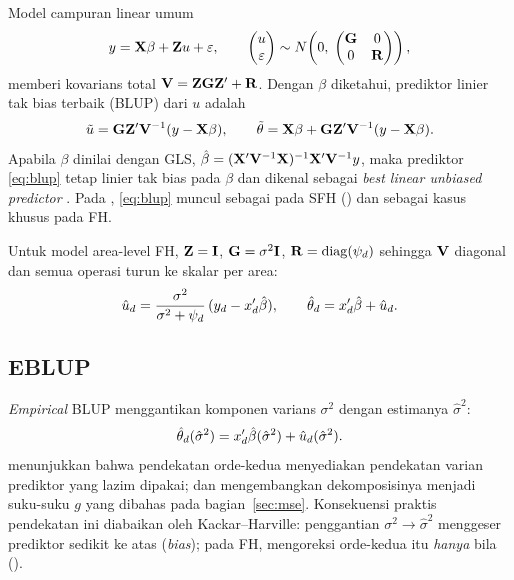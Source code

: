 Model campuran linear umum
\begin{equation}
  y=\mathbf{X}\beta+\mathbf{Z} u+\varepsilon,\qquad
  \begin{pmatrix}u\\\varepsilon\end{pmatrix}
  \sim N\!\left(0,\;
  \begin{pmatrix}\mathbf G&0\\0&\mathbf{R}\end{pmatrix}\right),
  \label{eq:lmm}
\end{equation}
memberi kovarians total $\mathbf{V}=\mathbf{Z}\mathbf G\mathbf{Z}'+\mathbf{R}$. Dengan $\beta$
diketahui, prediktor linier tak bias terbaik (BLUP) dari $u$ adalah
\begin{equation}
  \tilde u=\mathbf G\mathbf{Z}'\mathbf{V}^{-1}(y-\mathbf{X}\beta),
  \qquad
  \tilde\theta=\mathbf{X}\beta+\mathbf G\mathbf{Z}'\mathbf{V}^{-1}(y-\mathbf{X}\beta).
  \label{eq:blup}
\end{equation}
Apabila $\beta$ dinilai dengan GLS, $\hat\beta=(\mathbf{X}'\mathbf{V}^{-1}\mathbf{X})^{-1}
\mathbf{X}'\mathbf{V}^{-1}y$, maka prediktor \eqref{eq:blup} tetap linier tak bias pada
$\beta$ dan dikenal sebagai \emph{best linear unbiased predictor}
\citep{kackar1984approximations}. Pada , \eqref{eq:blup} muncul
sebagai  pada SFH
() dan sebagai kasus khusus pada FH.

Untuk model area-level FH, $\mathbf{Z}=\mathbf{I}$, $\mathbf G=\sigma^2\mathbf{I}$,
$\mathbf{R}=\mathrm{diag}(\psi_d)$ sehingga $\mathbf{V}$ diagonal dan semua operasi
turun ke skalar per area:
\begin{equation}
  \hat u_d=\frac{\sigma^2}{\sigma^2+\psi_d}\,(y_d-x_d'\hat\beta),
  \qquad
  \hat\theta_d=x_d'\hat\beta+\hat u_d.
  \label{eq:fh-blup}
\end{equation}

\subsection{EBLUP}\label{sec:eblup}

\emph{Empirical} BLUP menggantikan komponen varians $\sigma^2$ dengan
estimanya $\hat\sigma^2$:
\begin{equation}
  \hat\theta_d(\hat\sigma^2)=x_d'\hat\beta(\hat\sigma^2)
  +\hat u_d(\hat\sigma^2).
  \label{eq:eblup}
\end{equation}
\citet{kackar1984approximations} menunjukkan bahwa pendekatan orde-kedua
menyediakan pendekatan varian prediktor yang lazim dipakai; \citet{prasad1990estimation}
dan \citet{datta2000unified} mengembangkan dekomposisinya menjadi suku-suku
$g$ yang dibahas pada bagian~\ref{sec:mse}. Konsekuensi praktis pendekatan ini
diabaikan oleh Kackar--Harville: penggantian $\sigma^2\to\hat\sigma^2$
menggeser prediktor sedikit ke atas (\emph{bias}); pada FH, 
mengoreksi orde-kedua itu \emph{hanya} bila 
().

